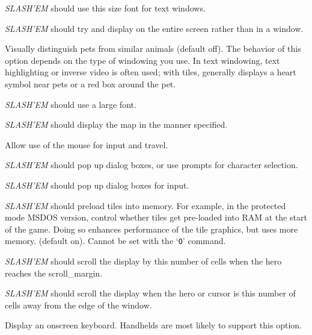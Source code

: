 \item[\ib{font\_size\_text	}]
{\it SLASH'EM\/} should use this size font for text windows.

\item[\ib{fullscreen}]
{\it SLASH'EM\/} should try and display on the entire screen rather than in a window.

\item[\ib{hilite\_pet}]
Visually distinguish pets from similar animals (default off).
The behavior of this option depends on the type of windowing you use.
In text windowing, text highlighting or inverse video is often used;
with tiles, generally displays a heart symbol near pets or a red box
around the pet.

\item[\ib{large\_font	}]
{\it SLASH'EM\/} should use a large font.

\item[\ib{map\_mode	}]
{\it SLASH'EM\/} should display the map in the manner specified.

\item[\ib{mouse\_support}]
Allow use of the mouse for input and travel.

\item[\ib{player\_selection}]
{\it SLASH'EM\/} should pop up dialog boxes, or use prompts for character selection.

\item[\ib{popup\_dialog	}]
{\it SLASH'EM\/} should pop up dialog boxes for input.

\item[\ib{preload\_tiles}]
{\it SLASH'EM\/} should preload tiles into memory.
For example, in the protected mode MSDOS version, control whether tiles
get pre-loaded into RAM at the start of the game.  Doing so
enhances performance of the tile graphics, but uses more memory. (default on).
Cannot be set with the `{\tt O}' command.

\item[\ib{scroll\_amount}]
{\it SLASH'EM\/} should scroll the display by this number of cells
when the hero reaches the scroll\_margin.

\item[\ib{scroll\_margin}]
{\it SLASH'EM\/} should scroll the display when the hero or cursor
is this number of cells away from the edge of the window.

\item[\ib{softkeyboard}]
Display an onscreen keyboard.  Handhelds are most likely to support this option.

